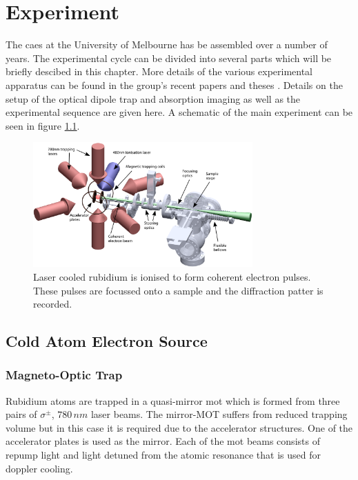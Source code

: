 \chapter{Experiment}

The \gls{caes} at the University of Melbourne has be assembled over a number of years. The experimental cycle can be divided into several parts which will be briefly descibed in this chapter. More details of the various experimental apparatus can be found in the group's recent papers \cite{bell_slow_2010, mcculloch_arbitrarily_2011, saliba_spatial_2012} and theses \cite{mcculloch_towards_2012, sheludko_shaped_2010, saliba_partially_2011}. Details on the setup of the optical dipole trap and absorption imaging as well as the experimental sequence are given here. A schematic of the main experiment can be seen in figure \ref{fig:experiment}.

\begin{figure}[h]
\includegraphics[width=0.75\textwidth]{figs/MOT_and_sample.pdf}
\caption{Laser cooled rubidium is ionised to form coherent electron pulses. These pulses are focussed onto a sample and the diffraction patter is recorded.}
\label{fig:experiment}
\end{figure}

\section{Cold Atom Electron Source}
\subsection{Magneto-Optic Trap}
Rubidium atoms are trapped in a quasi-mirror \gls{mot} which is formed from three pairs of $\sigma^\pm$, $780\,\unit{nm}$ laser beams. The mirror-MOT suffers from reduced trapping volume\cite{reichel_atomic_1999} but in this case it is required due to the accelerator structures. One of the accelerator plates is used as the mirror. Each of the \gls{mot} beams consists of repump light and light detuned from the atomic resonance that is used for doppler cooling.

